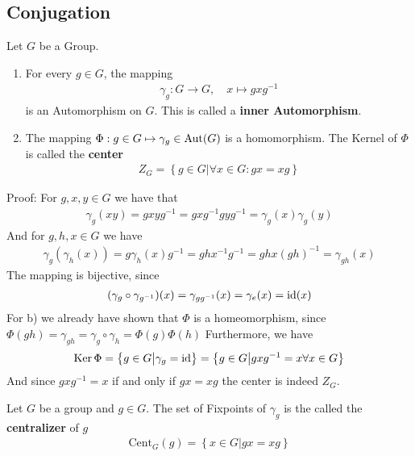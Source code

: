 \subsection{Conjugation}

\begin{lemma}[]
	Let $G$ be a Group.
	\begin{enumerate}
	\item For every $g \in G$, the mapping
		\begin{align*}
			\gamma_g: G \to G, \quad x \mapsto gxg^{-1}
		\end{align*}
		is an Automorphism on $G$. This is called a \textbf{inner Automorphism}.
	\item The mapping $\Phi: g \in G \mapsto \gamma_g \in \operatorname{Aut}(G)$ is a homomorphism. The Kernel of $\Phi$ is called the \textbf{center}
		\begin{align*}
			Z_G = \left\{g \in G \big\vert \forall x \in G: gx = xg\right\}
		\end{align*}
	\end{enumerate}
\end{lemma}
Proof: For $g,x,y \in G$ we have that
\begin{align*}
	\gamma_g(xy) = gxyg^{-1} = gxg^{-1}gyg^{-1} = \gamma_g(x) \gamma_g(y)
\end{align*}
And for $g,h,x \in G$ we have
\begin{align*}
	\gamma_g(\gamma_h(x)) = g \gamma_h(x)g^{-1} = ghx^{-1}g^{-1} = gh x (gh)^{-1} = \gamma_{gh}(x)
\end{align*}
The mapping is bijective, since
\begin{align*}
	(\gamma_g \circ \gamma_{g^{-1}})(x) = \gamma_{gg^{-1}}(x) = \gamma_{e}(x) = \operatorname{id}(x) 
\end{align*}
For b) we already have shown that $\Phi$ is a homeomorphism, since $\Phi(gh) = \gamma_{gh} = \gamma_g \circ \gamma_h = \Phi(g) \Phi(h)$
Furthermore, we have
\begin{align*}
	\operatorname{Ker} \Phi = \left\{g \in G \big\vert \gamma_g = \operatorname{id}\right\} = \left\{g \in G \big\vert gxg^{-1} = x \forall x \in G\right\}
\end{align*}
And since $gxg^{-1} = x$ if and only if $gx = xg$ the center is indeed $Z_G$.

\begin{definition}[]
Let $G$ be a group and $g \in G$. The set of Fixpoints of $\gamma_g$ is the called the \textbf{centralizer} of $g$
\begin{align*}
	\text{Cent}_G(g) = \left\{x \in G \big\vert gx = xg\right\}
\end{align*}
\end{definition}

